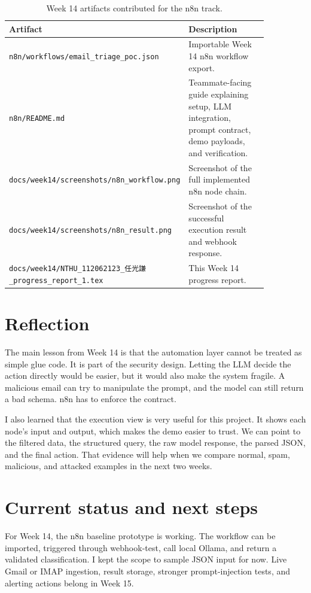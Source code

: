 \documentclass[11pt,a4paper]{article}
\begin{document}
\begin{table}[h]
\centering
\begin{tabular}{p{0.34\linewidth} p{0.52\linewidth}}
\toprule
\textbf{Artifact} & \textbf{Description} \\
\midrule
\texttt{n8n/workflows/email\_triage\_poc.json} & Importable Week 14 n8n workflow export. \\
\texttt{n8n/README.md} & Teammate-facing guide explaining setup, LLM integration, prompt contract, demo payloads, and verification. \\
\texttt{docs/week14/screenshots/n8n\_workflow.png} & Screenshot of the full implemented n8n node chain. \\
\texttt{docs/week14/screenshots/n8n\_result.png} & Screenshot of the successful execution result and webhook response. \\
\texttt{docs/week14/NTHU\_112062123\_任光謙\_progress\_report\_1.tex} & This Week 14 progress report. \\
\bottomrule
\end{tabular}
\caption{Week 14 artifacts contributed for the n8n track.}
\end{table}

\section{Reflection}

The main lesson from Week 14 is that the automation layer cannot be treated as simple glue code. It is part of the security design. Letting the LLM decide the action directly would be easier, but it would also make the system fragile. A malicious email can try to manipulate the prompt, and the model can still return a bad schema. n8n has to enforce the contract.

I also learned that the execution view is very useful for this project. It shows each node's input and output, which makes the demo easier to trust. We can point to the filtered data, the structured query, the raw model response, the parsed JSON, and the final action. That evidence will help when we compare normal, spam, malicious, and attacked examples in the next two weeks.

\section{Current status and next steps}

For Week 14, the n8n baseline prototype is working. The workflow can be imported, triggered through webhook-test, call local Ollama, and return a validated classification. I kept the scope to sample JSON input for now. Live Gmail or IMAP ingestion, result storage, stronger prompt-injection tests, and alerting actions belong in Week 15.
\end{document}
